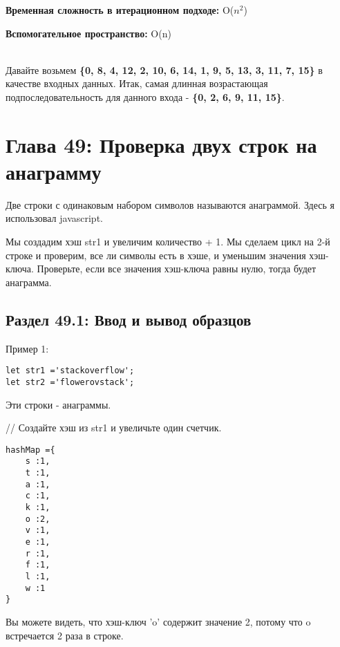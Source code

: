 \textbf{Временная сложность в итерационном подходе:} O($n^2$)
\vspace{\baselineskip}

\textbf{Вспомогательное пространство:} O(n)
\vspace{\baselineskip}

\vspace{\baselineskip}
\\
Давайте возьмем \textbf{\{0, 8, 4, 12, 2, 10, 6, 14, 1, 9, 5, 13, 3, 11, 7, 15\}} в качестве
входных данных. Итак, самая длинная возрастающая подпоследовательность
для данного входа - \textbf{\{0, 2, 6, 9, 11, 15\}}.

\newpage
\chapter*{Глава 49: Проверка двух строк на анаграмму}
Две строки с одинаковым набором символов называются анаграммой. Здесь
я использовал javascript.
\vspace{\baselineskip}

Мы создадим хэш str1 и увеличим количество + 1. Мы сделаем цикл на 2-й
строке и проверим, все ли символы есть в хэше, и уменьшим значения хэш-
ключа. Проверьте, если все значения хэш-ключа равны нулю, тогда будет
анаграмма.
\section*{Раздел 49.1: Ввод и вывод образцов}
Пример 1:
\vspace{\baselineskip}
\begin{tcolorbox}
\begin{verbatim}     
let str1 ='stackoverflow';
let str2 ='flowerovstack';
\end{verbatim}
\end{tcolorbox}
\vspace{\baselineskip}
Эти строки - анаграммы.
\vspace{\baselineskip}

// Создайте хэш из str1 и увеличьте один счетчик.
\vspace{\baselineskip}
\begin{tcolorbox}
\begin{verbatim}     
hashMap ={
    s :1,    
    t :1,    
    a :1,    
    c :1,   
    k :1,
    o :2,
    v :1,
    e :1,
    r :1,
    f :1,
    l :1, 
    w :1
}
\end{verbatim}
\end{tcolorbox}
\vspace{\baselineskip}
Вы можете видеть, что хэш-ключ 'o' содержит значение 2, потому что o
встречается 2 раза в строке.
\vspace{\baselineskip}

